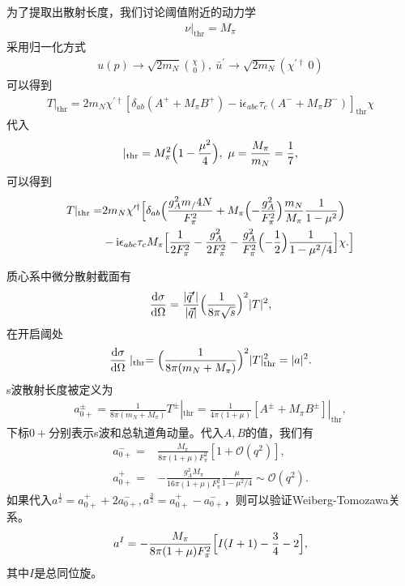 \documentclass[aps,tightenlines,16pt]{ctexart}
\numberwithin{equation}{section}
\newcommand{\mO}{\mathcal{O}}
\begin{document}
为了提取出散射长度，我们讨论阈值附近的动力学
\begin{align}
   \nu|_{\text{thr}}=M_{\pi}
\end{align}
采用归一化方式
\begin{align}
   u(p)\to \sqrt{2m_N}\binom{\chi}{0},\ \bar{u}^{\prime}\to\sqrt{2m_N}\left(\chi^{\prime \dagger} \  0\right)  
\end{align}
可以得到
\begin{align}
   T|_{\text{thr}}=2m_N\chi^{\prime\dagger}[\delta_{ab}(A^++M_{\pi}B^+)-\mbox{i}\epsilon_{abc}\tau_c(A^-+M_{\pi}B^-)]_{\text{thr}}\chi
\end{align}
代入
\begin{align}
   [\nu^2-\nu_B^2]|_{\text{thr}}=M_{\pi}^2\Bigl(1-\frac{\mu^2}{4}\Bigr),\ \mu=\frac{M_{\pi}}{m_N}=\frac{1}{7},
\end{align}
可以得到
\begin{align}
   \begin{aligned}
      T|_{\text{thr}}=&2m_N\chi^{\prime\dagger}\Bigl[\delta_{ab}\Bigl(\frac{g_A^2m_/4N}{F_{\pi}^2}+M_{\pi}\Bigl(-\frac{g_A^2}{F_{\pi}^2}\Bigr)\frac{m_N}{M_{\pi}}\frac{1}{1-\mu^2}\Bigr)\\
      &-\mbox{i}\epsilon_{abc}\tau_cM_{\pi}\Bigl[\frac{1}{2F_{\pi}^2}-\frac{g_A^2}{2F_{\pi}^2}-\frac{g_A^2}{F_{\pi}^2}\Bigl(-\frac{1}{2}\Bigr)\frac{1}{1-\mu^2/4}\Bigr]\chi.
      \Bigr]
   \end{aligned}
\end{align}

质心系中微分散射截面有
\begin{align}
   \frac{\mbox{d}\sigma}{\mbox{d}\Omega}=\frac{|\vec{q}^{\prime}|}{|\vec{q}|}\Bigl(\frac{1}{8\pi\sqrt{s}}\Bigr)^2|T|^2,
\end{align}
在开启阈处
\begin{align}
   \frac{\mbox{d}\sigma}{\mbox{d}\Omega}\mid_{\text{thr}}=\Bigl(\frac{1}{8\pi(m_N+M_{\pi})}\Bigr)^2|T|^2_{\text{thr}}=|a|^2.
\end{align}
s波散射长度被定义为
\begin{align}
   a^{\pm}_{0+}=\frac{1}{8\pi(m_N+M_{\pi})}T^{\pm}|_{\text{thr}}=\frac{1}{4\pi(1+\mu)}[A^{\pm}+M_{\pi}B^{\pm}]|_{\text{thr}},
\end{align}
下标$0+$分别表示s波和总轨道角动量。代入$A,B$的值，我们有
\begin{align}
   a_{0+}^-=&\frac{M_{\pi}}{8\pi(1+\mu)F_{\pi}^2}[1+\mO(q^2)],\\
   a_{0+}^+=&-\frac{g_A^2M_{\pi}}{16\pi(1+\mu)F_{\pi}^2}\frac{\mu}{1-\mu^2/4}\sim\mO(q^2).
\end{align}
如果代入$a^{\frac{1}{2}}=a_{0+}^++2a_{0+}^-,a^{\frac{3}{2}}=a_{0+}^+-a_{0+}^-$，则可以验证Weiberg-Tomozawa关系。
\begin{align}
   a^I=-\frac{M_{\pi}}{8\pi(1+\mu)F_{\pi}^2}\Bigl[I(I+1)-\frac{3}{4}-2\Bigr],
\end{align}
其中$I$是总同位旋。
\newpage

\renewcommand\refname{参考文献}




\end{document}
